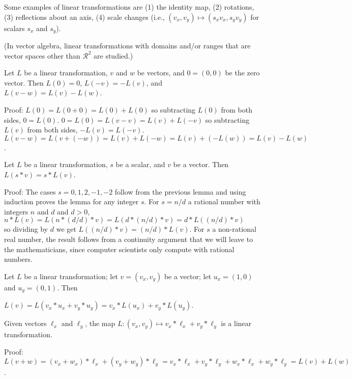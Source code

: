 \documentclass[12pt]{article}
\begin{document}
Some examples of linear transformations are (1) the identity map,
(2) rotations, (3) reflections about an axis, (4) scale changes
(i.e., $(v_x,v_y)\longmapsto(s_x v_x,s_y v_y)$ for scalars $s_x$
and $s_y$).

(In vector algebra, linear transformations with domains and/or ranges
that are vector spaces other than $\mathcal{R}^2$ are studied.)


\begin{lemma}
Let $L$ be a linear transformation, $v$ and $w$ be vectors,
and $0=(0,0)$ be the zero vector.  Then $L(0)=0$,  $L(-v)=-L(v)$,
and $L(v-w) = L(v) - L(w)$.
\end{lemma}
\begin{indpar}{0.5in}
Proof: $L(0) = L(0+0)= L(0) + L(0)$ so subtracting $L(0)$
from both sides, $0=L(0)$.  $0 = L(0) = L(v-v) = L(v) + L(-v)$
so subtracting $L(v)$ from both sides, $-L(v)=L(-v)$.
$L(v-w)=L(v+(-w))=L(v)+L(-w)=L(v)+(-L(w))=L(v)-L(w)$.
\end{indpar}

\begin{lemma}
Let $L$ be a linear transformation, $s$ be a scalar, and $v$ be a vector.
Then $L(s*v)=s*L(v)$.
\end{lemma}
\begin{indpar}{0.5in}
Proof: The cases $s=0,1,2,-1,-2$ follow from the previous lemma and
using induction proves the lemma for any integer $s$.  For $s=n/d$
a rational number with integers $n$ and $d$ and $d>0$, \\
\hspace*{0.1in}$n*L(v) = L(n*(d/d)*v) = L(d*(n/d)*v)=d*L((n/d)*v)$ \\
so dividing by $d$
we get $L((n/d)*v)=(n/d)*L(v)$.  For $s$ a non-rational real number,
the result follows from a continuity argument that we will leave
to the mathematicians, since computer scientists only compute
with rational numbers.
\end{indpar}

Let $L$ be a linear transformation; let $v=(v_x,v_y)$ be a vector;
let $u_x=(1,0)$ and $u_y =(0,1)$.  Then \\
\centerline{$L(v) = L(v_x*u_x+v_y*u_y)=v_x*L(u_x)+v_y*L(u_y)$.}

\begin{lemma}
Given vectors $\ell_x$ and $\ell_y$, the map
$L:(v_x,v_y)\longmapsto v_x*\ell_x+v_y*\ell_y$ is a linear
transformation.
\end{lemma}
\begin{indpar}{0.5in}
Proof: $L(v+w) = (v_x+w_x)*\ell_x+(v_y+w_y)*\ell_y
               = v_x*\ell_x+v_y*\ell_y+w_x*\ell_x+w_y*\ell_y
	       = L(v) + L(w)$.
\end{indpar}
\end{document}
